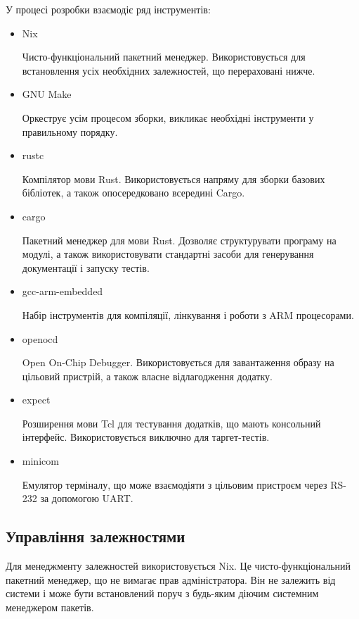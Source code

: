 \documentclass[main.tex]{subfiles}
\begin{document}
У процесі розробки взаємодіє ряд інструментів:
\begin{itemize}%
\item Nix\cite{nix}

  Чисто-функціональний пакетний менеджер. Використовується для встановлення усіх необхідних залежностей, що перераховані нижче.

\item GNU Make\cite{gnu-make}

  Оркеструє усім процесом зборки, викликає необхідні інструменти у правильному порядку.

\item rustc

  Компілятор мови Rust. Використовується напряму для зборки базових бібліотек, а також опосередковано всередині Cargo.

\item cargo\cite{cargo}

  Пакетний менеджер для мови Rust. Дозволяє структурувати програму на модулі, а також використовувати стандартні засоби для генерування документації і запуску тестів.

\item gcc-arm-embedded\cite{gcc-arm-embedded}

  Набір інструментів для компіляції, лінкування і роботи з ARM процесорами.

\item openocd\cite{openocd}

  Open On-Chip Debugger. Використовується для завантаження образу на цільовий пристрій, а також власне відлагодження додатку.

\item expect\cite{expect}

  Розширення мови Tcl\cite{tcl} для тестування додатків, що мають консольний інтерфейс. Використовується виключно для таргет-тестів.

\item minicom\cite{minicom}

  Емулятор терміналу, що може взаємодіяти з цільовим пристроєм через RS-232 за допомогою UART.
\end{itemize}

\subsection{Управління залежностями}

Для менеджменту залежностей використовується Nix. Це чисто-функціональний пакетний менеджер, що не вимагає прав адміністратора. Він не залежить від системи і може бути встановлений поруч з будь-яким діючим системним менеджером пакетів.
\end{document}
